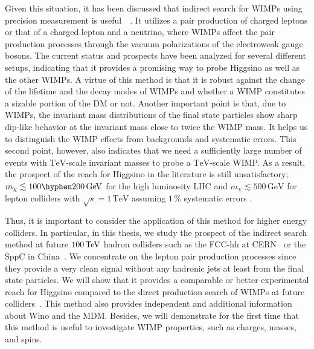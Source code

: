 \documentclass[12pt,twoside,book]{article}
\begin{document}
Given this situation, it has been discussed that indirect search for WIMPs using precision measurement is useful~~\cite{Alves:2014cda, Gross:2016ioi, Farina:2016rws,Harigaya:2015yaa, Matsumoto:2017vfu, DiLuzio:2018jwd, Matsumoto:2018ioi}.
It utilizes a pair production of charged leptons or that of a charged lepton and a neutrino, where WIMPs affect the pair production processes through the vacuum polarizations of the electroweak gauge bosons.
The current status and prospects have been analyzed for several different setups, indicating that it provides a promising way to probe Higgsino as well as the other WIMPs.
A virtue of this method is that it is robust against the change of the lifetime and the decay modes of WIMPs and whether a WIMP constitutes a sizable portion of the DM or not.
Another important point is that, due to WIMPs, the invariant mass distributions of the final state particles show sharp dip-like behavior at the invariant mass close to twice the WIMP mass.
It helps us to distinguish the WIMP effects from backgrounds and systematic errors.
This second point, however, also indicates that we need a sufficiently large number of events with $\mathrm{TeV}$-scale invariant masses to probe a $\mathrm{TeV}$-scale WIMP.
As a result, the prospect of the reach for Higgsino in the literature is still unsatisfactory; $m_\chi \lesssim 100 \hyphen 200\,\mathrm{GeV}$ for the high luminosity LHC \cite{Matsumoto:2017vfu,  Matsumoto:2018ioi} and $m_\chi \lesssim 500\,\mathrm{GeV}$ for lepton colliders with $\sqrt{s}=1\,\mathrm{TeV}$ assuming $1\,\%$ systematic errors \cite{Harigaya:2015yaa}.

Thus, it is important to consider the application of this method for higher energy colliders.
In particular, in this thesis, we study the prospect of the indirect search method at future $100\,{\rm TeV}$ hadron colliders such as the FCC-hh at CERN~\cite{Mangano:2016jyj, Contino:2016spe, Golling:2016gvc} or the SppC in China~\cite{CEPC-SPPCStudyGroup:2015csa, CEPC-SPPCStudyGroup:2015esa}.
We concentrate on the lepton pair production processes since they provide a very clean signal without any hadronic jets at least from the final state particles.
We will show that it provides a comparable or better experimental reach for Higgsino compared to the direct production search of WIMPs at future colliders~\cite{Low:2014cba, Cirelli:2014dsa, Han:2018wus, Mahbubani:2017gjh}.
This method also provides independent and additional information about Wino and the MDM.
Besides, we will demonstrate for the first time that this method is useful to investigate WIMP properties, such as charges, masses, and spins.
\end{document}
